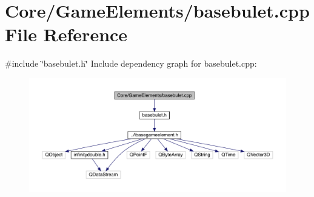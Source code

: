 \hypertarget{a00032}{}\section{Core/\+Game\+Elements/basebulet.cpp File Reference}
\label{a00032}
{\ttfamily \#include \char`\"{}basebulet.\+h\char`\"{}}\newline
Include dependency graph for basebulet.\+cpp\+:
\nopagebreak
\begin{figure}[H]
\begin{center}
\leavevmode
\includegraphics[width=350pt]{d0/dc0/a00033}
\end{center}
\end{figure}
